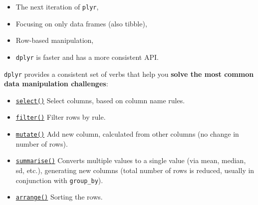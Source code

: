 \documentclass[
]{article}
\begin{document}
\begin{itemize}
\item
  The next iteration of \texttt{plyr},
\item
  Focusing on only data frames (also tibble),
\item
  Row-based manipulation,
\item
  \texttt{dplyr} is faster and has a more consistent API.
\end{itemize}

\texttt{dplyr} provides a consistent set of verbs that help you
\textbf{solve the most common data manipulation challenges}:

\begin{itemize}
\item
  \href{https://dplyr.tidyverse.org/reference/select.html}{\texttt{select()}}
  Select columns, based on column name rules.
\item
  \href{https://dplyr.tidyverse.org/reference/filter.html}{\texttt{filter()}}
  Filter rows by rule.
\item
  \href{https://dplyr.tidyverse.org/reference/mutate.html}{\texttt{mutate()}}
  Add new column, calculated from other columns (no change in number of
  rows).
\item
  \href{https://dplyr.tidyverse.org/reference/summarise.html}{\texttt{summarise()}}
  Converts multiple values to a single value (via mean, median, sd,
  etc.), generating new columns (total number of rows is reduced,
  usually in conjunction with \texttt{group\_by}).
\item
  \href{https://dplyr.tidyverse.org/reference/arrange.html}{\texttt{arrange()}}
  Sorting the rows.
\end{itemize}
\end{document}
